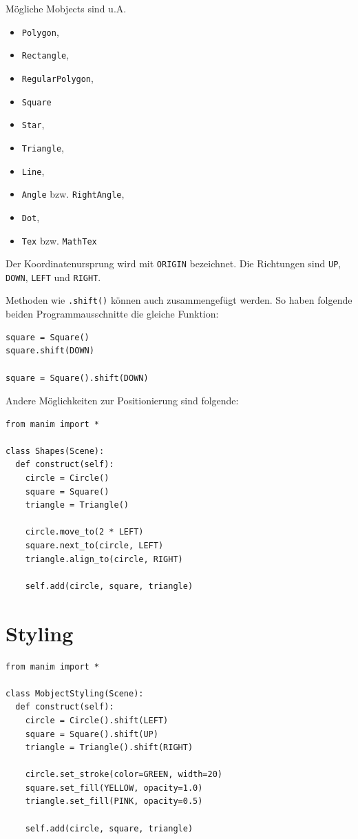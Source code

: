 \documentclass[12pt]{article}
\begin{document}
	Mögliche Mobjects sind u.A.
	\begin{itemize}
		\item \verb|Polygon|,
		\item \verb|Rectangle|,
		\item \verb*|RegularPolygon|,
		\item \verb*|Square|
		\item \verb*|Star|,
		\item \verb*|Triangle|,
		\item \verb*|Line|,
		\item \verb*|Angle| bzw. \verb*|RightAngle|,
		\item \verb*|Dot|,
		\item \verb*|Tex| bzw. \verb*|MathTex|
	\end{itemize}
	
	Der Koordinatenursprung wird mit \verb*|ORIGIN| bezeichnet. Die Richtungen sind \verb*|UP|, \verb*|DOWN|, \verb*|LEFT| und \verb*|RIGHT|.
	
	Methoden wie \verb|.shift()| können auch zusammengefügt werden. So haben folgende beiden Programmausschnitte die gleiche Funktion:
	
	\begin{verbatim}
square = Square()
square.shift(DOWN)

square = Square().shift(DOWN)
	\end{verbatim}
	
	Andere Möglichkeiten zur Positionierung sind folgende:
	
	\begin{verbatim}
from manim import *
	
class Shapes(Scene):
  def construct(self):
    circle = Circle()
	square = Square()
	triangle = Triangle()
	
	circle.move_to(2 * LEFT)
	square.next_to(circle, LEFT)
	triangle.align_to(circle, RIGHT)
	
	self.add(circle, square, triangle)
\end{verbatim}

	\section{Styling}
	
\begin{verbatim}
from manim import *

class MobjectStyling(Scene):
  def construct(self):
    circle = Circle().shift(LEFT)
    square = Square().shift(UP)
    triangle = Triangle().shift(RIGHT)

    circle.set_stroke(color=GREEN, width=20)
    square.set_fill(YELLOW, opacity=1.0)
    triangle.set_fill(PINK, opacity=0.5)

    self.add(circle, square, triangle)
\end{verbatim}
\end{document}

